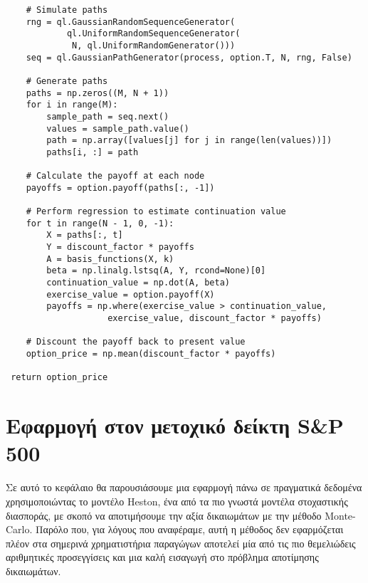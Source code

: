 \documentclass[12pt,a4paper,twoside,openany]{book}
\begin{document}
\begin{lstlisting}
 	# Simulate paths
 	rng = ql.GaussianRandomSequenceGenerator(
 			ql.UniformRandomSequenceGenerator(
 			 N, ql.UniformRandomGenerator()))
 	seq = ql.GaussianPathGenerator(process, option.T, N, rng, False)
 			
 	# Generate paths
 	paths = np.zeros((M, N + 1))
 	for i in range(M):
 		sample_path = seq.next()
 		values = sample_path.value()
 		path = np.array([values[j] for j in range(len(values))])
 		paths[i, :] = path
 			
 	# Calculate the payoff at each node
 	payoffs = option.payoff(paths[:, -1])
 			
 	# Perform regression to estimate continuation value
 	for t in range(N - 1, 0, -1):
 		X = paths[:, t]
 		Y = discount_factor * payoffs
 		A = basis_functions(X, k)
 		beta = np.linalg.lstsq(A, Y, rcond=None)[0]
 		continuation_value = np.dot(A, beta)
 		exercise_value = option.payoff(X)
 		payoffs = np.where(exercise_value > continuation_value, 
 					exercise_value, discount_factor * payoffs)
 		
 	# Discount the payoff back to present value
 	option_price = np.mean(discount_factor * payoffs)
 		
 return option_price\end{lstlisting}
 \vspace{4mm}
 	
 	
 	
 	
 		
 		
 		
\chapter{Εφαρμογή στον μετοχικό δείκτη S\&P 500}  	
 	Σε αυτό το κεφάλαιο θα παρουσιάσουμε μια εφαρμογή πάνω σε πραγματικά δεδομένα χρησιμοποιώντας το μοντέλο Heston, ένα από τα πιο γνωστά μοντέλα στοχαστικής διασποράς, με σκοπό να αποτιμήσουμε την αξία δικαιωμάτων με την μέθοδο Monte-Carlo. Παρόλο που, για λόγους που αναφέραμε, αυτή η μέθοδος δεν εφαρμόζεται πλέον στα σημερινά χρηματιστήρια παραγώγων αποτελεί μία από τις πιο θεμελιώδεις αριθμητικές προσεγγίσεις και μια καλή εισαγωγή στο πρόβλημα αποτίμησης δικαιωμάτων. 
 
\end{document}
